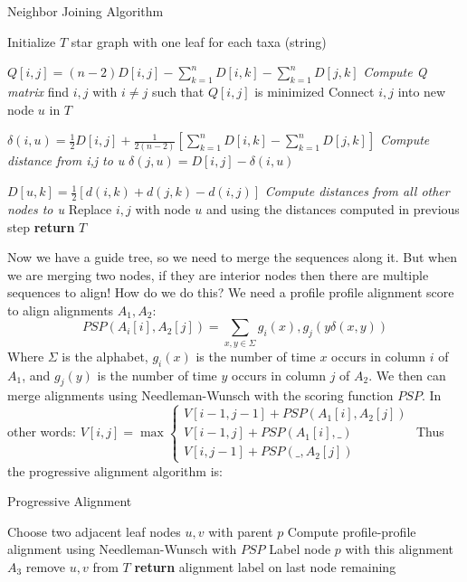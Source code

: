 \documentclass[11pt]{article}
\begin{document}
\begin{algorithm}[H]
    \caption{Neighbor Joining Algorithm}
    \label{alg:nj}
    \begin{algorithmic}[1]
        \State Initialize $T$ star graph with one leaf for each taxa (string)
            
            \State $Q[i,j] = (n-2) D[i, j] - \sum_{k=1}^n D[i, k] - \sum_{k=1}^n D[j, k]$
            \Comment \textit{Compute Q matrix}
            \State find $i, j$ with $i \neq j$ such that $Q[i,j]$ is minimized
            \State Connect $i, j$ into new node $u$ in $T$
            
            \State $\delta(i, u) = \frac{1}{2} D[i, j] + \frac{1}{2(n-2)} \left[\sum_{k=1}^n D[i,k] - \sum_{k=1}^n D[j,k] \right]$
            \Comment \textit{Compute distance from i,j to u}
            \State $\delta(j, u) = D[i, j] - \delta(i, u)$
            
            \State $D[u, k] = \frac{1}{2} \left[ d(i, k) + d(j, k) - d(i, j) \right]$
            \Comment \textit{Compute distances from all other nodes to u}
            \State Replace $i, j$ with node $u$ and using the distances computed in previous step
        \EndWhile
        \State \textbf{return} $T$
    \EndFunction
    \end{algorithmic}
\end{algorithm}

Now we have a guide tree, so we need to merge the sequences along it.
But when we are merging two nodes, if they are interior nodes then there are multiple sequences to align!
How do we do this?
We need a profile profile alignment score to align alignments $A_1, A_2$:
$$PSP(A_i[i], A_2[j]) = \sum_{x, y \in \Sigma} g_i(x), g_j(y \delta(x,y))$$
Where $\Sigma$ is the alphabet, $g_i(x)$ is the number of time $x$ occurs in column $i$ of $A_1$, 
and $g_j(y)$ is the number of time $y$ occurs in column $j$ of $A_2$.
We then can merge alignments using Needleman-Wunsch with the scoring function $PSP$.
In other words: $V[i,j] = \max \begin{cases}
    V[i-1, j-1] + PSP(A_1[i], A_2[j]) \\
    V[i-1, j] + PSP(A_1[i], \_) \\
    V[i, j-1] + PSP(\_, A_2[j])
\end{cases}$ 
Thus the progressive alignment algorithm is:

\begin{algorithm}[H]
    \caption{Progressive Alignment}
    \label{alg:nj}
    \begin{algorithmic}[1]
        \Repeat
        \State Choose two adjacent leaf nodes $u, v$ with parent $p$
        \State Compute profile-profile alignment using Needleman-Wunsch with $PSP$
        \State Label node $p$ with this alignment $A_3$
        \State remove $u, v$ from $T$
        \State \textbf{return} alignment label on last node remaining
    \EndFunction
    \end{algorithmic}
\end{algorithm}
\end{document}
